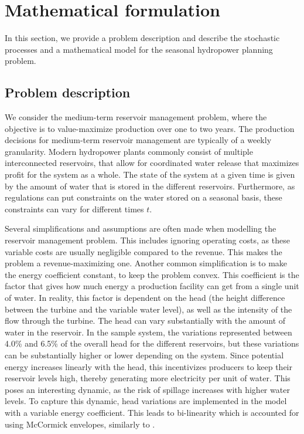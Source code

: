 \section{Mathematical formulation}
\label{section:mathematical model}

In this section, we provide a problem description and describe the stochastic processes and a mathematical model for the seasonal hydropower planning problem.

\subsection{Problem description}
\label{section: problem description}
We consider the medium-term reservoir management problem, where the objective is to value-maximize production over one to two years. The production decisions for medium-term reservoir management are typically of a weekly granularity.  Modern hydropower plants commonly consist of multiple interconnected reservoirs, that allow for coordinated water release that maximizes profit for the system as a whole. The state of the system at a given time is given by the amount of water that is stored in the different reservoirs. Furthermore, as regulations can put constraints on the water stored on a seasonal basis, these constraints can vary for different times $t$.

Several simplifications and assumptions are often made when modelling the reservoir management problem. This includes ignoring operating costs, as these variable costs are usually negligible compared to the revenue. This makes the problem a revenue-maximizing one. Another common simplification is to make the energy coefficient constant, to keep the problem convex. This coefficient is the factor that gives how much energy a production facility can get from a single unit of water. In reality, this factor is dependent on the head (the height difference between the turbine and the variable water level), as well as the intensity of the flow through the turbine. The head can vary substantially with the amount of water in the reservoir. In the sample system, the variations represented between 4.0\% and 6.5\% of the overall head for the different reservoirs, but these variations can be substantially higher or lower depending on the system. Since potential energy increases linearly with the head, this incentivizes producers to keep their reservoir levels high, thereby generating more electricity per unit of water. This poses an interesting dynamic, as the risk of spillage increases with higher water levels. To capture this dynamic, head variations are implemented in the model with a variable energy coefficient. This leads to bi-linearity which is accounted for using McCormick envelopes, similarly to \cite{cerisola2012a}.

